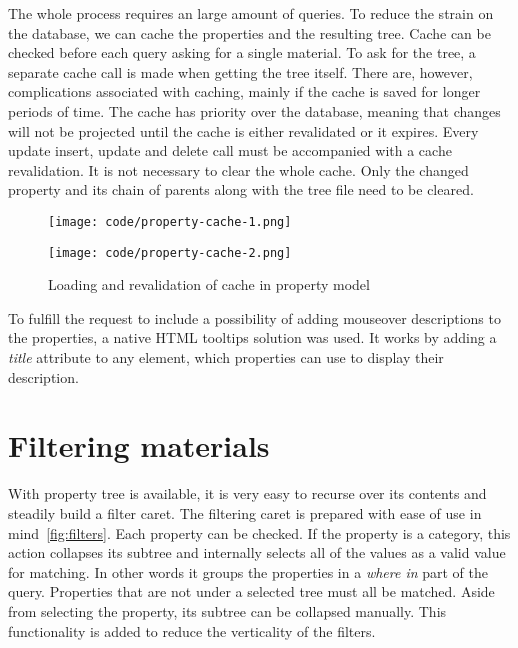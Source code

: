 \documentclass[
  digital,     %
  oneside,     %
  nosansbold,  %
  colorbold, %
  lof,         %
  lot,         %
]{fithesis4}
\begin{document}
The whole process requires an large amount of queries. To reduce the strain on the database, we can cache the properties and the resulting tree. Cache can be checked before each query asking for a single material. To ask for the tree, a separate cache call is made when getting the tree itself. There are, however, complications associated with caching, mainly if the cache is saved for longer periods of time. The cache has priority over the database, meaning that changes will not be projected until the cache is either revalidated or it expires. Every update insert, update and delete call must be accompanied with a cache revalidation. It is not necessary to clear the whole cache. Only the changed property and its chain of parents along with the tree file need to be cleared.

\begin{figure}[!htbp]
	\begin{center}
		\begin{minipage}{.8\textwidth}
			\texttt{[image: code/property-cache-1.png]}
		\end{minipage}
		\begin{minipage}{.8\textwidth}
			\texttt{[image: code/property-cache-2.png]}
		\end{minipage}
	\end{center}
	\caption{Loading and revalidation of cache in property model}
	\label{fig:property-cache}
\end{figure}

To fulfill the request to include a possibility of adding mouseover descriptions to the properties, a native HTML tooltips solution was used. It works by adding a \textit{title} attribute to any element, which properties can use to display their description.

\section{Filtering materials}

With property tree is available, it is very easy to recurse over its contents and steadily build a filter caret. The filtering caret is prepared with ease of use in mind~\ref{fig:filters}. Each property can be checked. If the property is a category, this action collapses its subtree and internally selects all of the values as a valid value for matching. In other words it groups the properties in a \textit{where in} part of the query. Properties that are not under a selected tree must all be matched. Aside from selecting the property, its subtree can be collapsed manually. This functionality is added to reduce the verticality of the filters.
\end{document}

